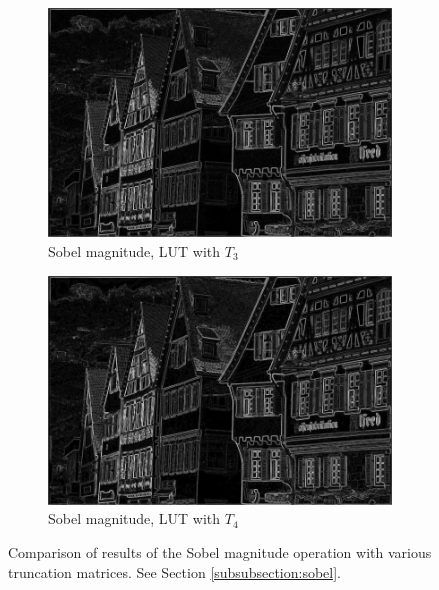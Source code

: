 \documentclass[12pt]{amsart}
\theoremstyle{definition}
\theoremstyle{remark}
\numberwithin{thm}{section}
\begin{document}
\begin{figure}[h]
\begin{subfigure}[b]{0.4\textwidth} \includegraphics[width=\textwidth]{german3.jpg} \caption{Sobel magnitude, LUT with $T_3$} %
\end{subfigure}
\begin{subfigure}[b]{0.4\textwidth} \includegraphics[width=\textwidth]{german4.jpg} \caption{Sobel magnitude, LUT with $T_4$} \end{subfigure}

\caption{Comparison of results of the Sobel magnitude operation with various truncation matrices. See Section \ref{subsubsection:sobel}.}
\label{fig:german_sobel} 
\end{figure}



\end{document}
